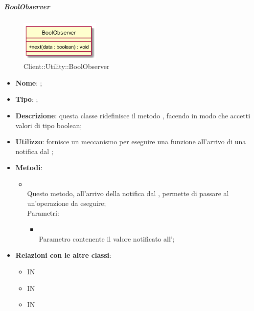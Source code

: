 \hypertarget{BoolObserver_label}{\subparagraph{BoolObserver}}
\begin{figure}[h]
	\centering
	\includegraphics[width=0.35\textwidth,height=\textheight,keepaspectratio]{images/ClassBoolObserver.png}
	\caption{Client::Utility::BoolObserver}
\end{figure}
\begin{itemize}
	\item \textbf{Nome}: ;
	\item \textbf{Tipo}: ;
	\item \textbf{Descrizione}: questa classe ridefinisce il metodo , facendo in modo che accetti valori di tipo boolean;
	\item \textbf{Utilizzo}: fornisce un meccanismo per eseguire una funzione all'arrivo di una notifica dal ;
	\item \textbf{Metodi}:
	\begin{itemize}
		\item[]  \\		Questo metodo, all'arrivo della notifica dal , permette di passare al  un'operazione da eseguire;\\
		Parametri:
		\begin{itemize}
			\item {} \\
			Parametro contenente il valore notificato all';
		\end{itemize}
	\end{itemize}
	\item \textbf{Relazioni con le altre classi}:
	\begin{itemize}
		\item IN \hyperlink{Recorder_label}{}
		\item IN \hyperlink{BoolObservable_label}{}
		\item IN \hyperlink{BoolSubject_label}{}
	\end{itemize}
\end{itemize}
\FloatBarrier

